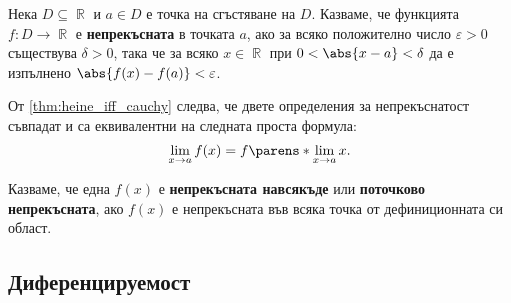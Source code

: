 \documentclass{../../common/topic}
\begin{document}
\begin{definition}
  Нека \( D \subseteq \BbbR \) и \( a \in D \) е точка на сгъстяване на \( D \). Казваме, че функцията \( f: D \to \BbbR \) е \textbf{непрекъсната} в точката \( a \), ако за всяко положително число \( \varepsilon > 0 \) съществува \( \delta > 0 \), така че за всяко \( x \in \BbbR \) при \( 0 < \abs{x - a} < \delta \) да е изпълнено \( \abs{f(x) - f(a)} < \varepsilon \).
\end{definition}

\begin{remark}
  От \cref{thm:heine_iff_cauchy} следва, че двете определения за непрекъснатост съвпадат и са еквивалентни на следната проста формула:
  \begin{equation*}
    \lim_{x \to a} f(x) = f\parens*{ \lim_{x \to a} x }.
  \end{equation*}
\end{remark}

\begin{definition}
  Казваме, че една \( f(x) \) е \textbf{непрекъсната навсякъде} или \textbf{поточково непрекъсната}, ако \( f(x) \) е непрекъсната във всяка точка от дефиниционната си област.
\end{definition}

\subsection{Диференцируемост}
\end{document}
